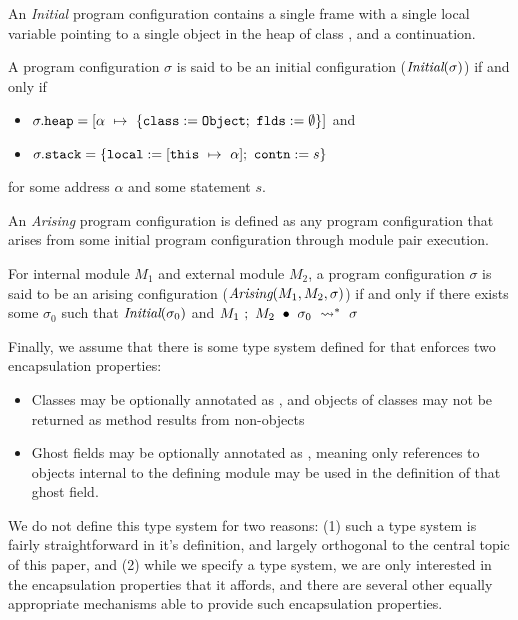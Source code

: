 An \emph{Initial} program configuration contains a single frame 
with a single local variable  pointing to a single object 
in the heap of class , and a continuation.
\begin{definition}
\label{def:initial}
A program configuration $\sigma$ is said to be an initial configuration ($\textit{Initial}(\sigma)$)
if and only if
\begin{itemize}
\item
$\sigma.\prg{heap} = [\alpha\ \mapsto\ \{\prg{class}:=\prg{Object};\ \prg{flds}:=\emptyset\}]$ and
\item
$\sigma.{\texttt{stack}} = \{{\texttt{local}}:=[{\texttt{this}}\ \mapsto\ \alpha];\ {\texttt{contn}}:= s\}$
\end{itemize} 
for some address $\alpha$ and some statement $s$.
\end{definition}

An \emph{Arising} program configuration is defined as any program configuration
that arises from some initial program configuration through module pair execution.
\begin{definition}
\label{def:arising}
For internal module $M_1$ and external module $M_2$, a program configuration $\sigma$ is 
said to be an arising configuration ($\textit{Arising}(M_1, M_2, \sigma)$)
if and only if there exists some $\sigma_0$ such that $\textit{Initial}(\sigma_0)$ and
$M_1\ ;\ M_2\ \bullet\ \sigma_0\ \leadsto^*\ \sigma$
\end{definition}

Finally, we assume that there is some type system defined for \Loo that enforces 
two encapsulation properties:
\begin{itemize}
\item
Classes may be optionally annotated as \enclosed, and objects of \enclosed classes
may not be returned as method results from non-\enclosed objects
\item
Ghost fields may be optionally annotated as , meaning only references to objects 
internal to the defining module may be used in the definition of that ghost field.
\end{itemize}
We do not define this type system for two reasons: (1) such a type system is fairly straightforward
in it's definition, and largely orthogonal to the central topic of this paper, and (2) while we
specify a type system, we are only interested in the encapsulation properties that it affords,
and there are several other equally appropriate mechanisms able to provide such encapsulation 
properties.


